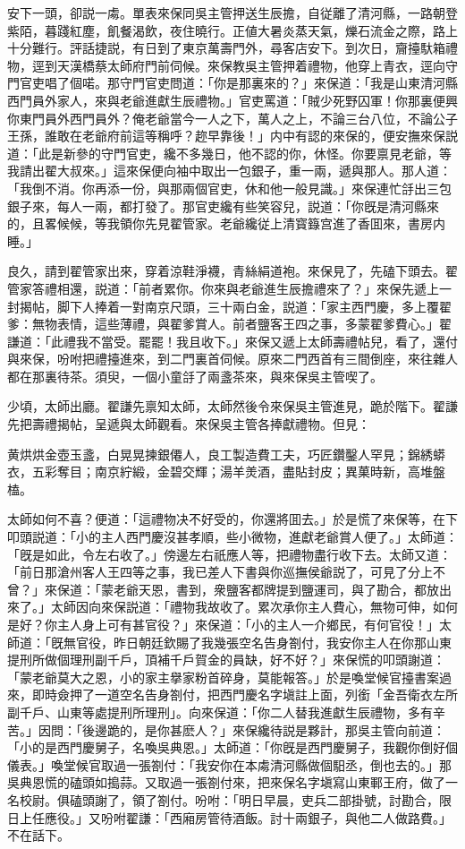安下一頭，卻説一䖏。單表來保同吳主管押送生辰擔，自従離了清河縣，一路朝登紫陌，暮踐紅塵，飢餐渴飲，夜住曉行。正値大暑炎蒸天氣，爍石流金之際，路上十分難行。評話捷説，有日到了東京萬壽門外，尋客店安下。到次日，齎擡馱箱禮物，逕到天漢橋蔡太師府門前伺候。來保教吳主管押着禮物，他穿上青衣，逕向守門官吏唱了個喏。那守門官吏問道：「你是那裏來的？」來保道：「我是山東清河縣西門員外家人，來與老爺進獻生辰禮物。」官吏罵道：「賊少死野囚軍！你那裏便興你東門員外西門員外？俺老爺當今一人之下，萬人之上，不論三台八位，不論公子王孫，誰敢在老爺府前這等稱呼？趂早靠後！」内中有認的來保的，便安撫來保説道：「此是新參的守門官吏，纔不多幾日，他不認的你，休怪。你要禀見老爺，等我請出翟大叔來。」這來保便向袖中取出一包銀子，重一兩，遞與那人。那人道：「我倒不消。你再添一份，與那兩個官吏，休和他一般見識。」來保連忙㧱出三包銀子來，每人一兩，都打發了。那官吏纔有些笑容兒，説道：「你旣是清河縣來的，且畧候候，等我領你先見翟管家。老爺纔従上清寳籙宫進了香囬來，書房内睡。」

良久，請到翟管家出來，穿着涼鞋淨襪，青絲絹道袍。來保見了，先磕下頭去。翟管家答禮相還，説道：「前者累你。你來與老爺進生辰擔禮來了？」來保先遞上一封揭帖，脚下人捧着一對南京尺頭，三十兩白金，説道：「家主西門慶，多上覆翟爹：無物表情，這些薄禮，與翟爹賞人。前者鹽客王四之事，多蒙翟爹費心。」翟謙道：「此禮我不當受。罷罷！我且收下。」來保又遞上太師壽禮帖兒，看了，還付與來保，吩咐把禮擡進來，到二門裏首伺候。原來二門西首有三間倒座，來往雜人都在那裏待茶。須臾，一個小童㧱了兩盞茶來，與來保吳主管喫了。

少頃，太師出廳。翟謙先禀知太師，太師然後令來保吳主管進見，跪於階下。翟謙先把壽禮揭帖，呈遞與太師觀看。來保吳主管各捧獻禮物。但見：

\begin{myquote}
黄烘烘金壺玉盞，白晃晃揀銀僊人，良工製造費工夫，巧匠鑽鑿人罕見；錦綉蟒衣，五彩奪目；南京紵緞，金碧交輝；湯羊羙酒，盡貼封皮；異菓時新，高堆盤榼。
\end{myquote}

太師如何不喜？便道：「這禮物决不好受的，你還將囬去。」於是慌了來保等，在下叩頭説道：「小的主人西門慶沒甚孝順，些小微物，進獻老爺賞人便了。」太師道：「旣是如此，令左右收了。」傍邊左右祇應人等，把禮物盡行收下去。太師又道：「前日那滄州客人王四等之事，我已差人下書與你巡撫侯爺説了，可見了分上不曾？」來保道：「蒙老爺天恩，書到，衆鹽客都牌提到鹽運司，與了勘合，都放出來了。」太師因向來保説道：「禮物我故收了。累次承你主人費心，無物可伸，如何是好？你主人身上可有甚官役？」來保道：「小的主人一介鄉民，有何官役！」太師道：「旣無官役，昨日朝廷欽賜了我幾張空名告身劄付，我安你主人在你那山東提刑所做個理刑副千戶，頂補千戶賀金的員缺，好不好？」來保慌的叩頭謝道：「蒙老爺莫大之恩，小的家主擧家粉首碎身，莫能報答。」於是喚堂候官擡書案過來，即時僉押了一道空名告身劄付，把西門慶名字塡註上面，列銜「金吾衛衣左所副千戶、山東等處提刑所理刑」。向來保道：「你二人替我進獻生辰禮物，多有辛苦。」因問：「後邊跪的，是你甚麽人？」來保纔待説是夥計，那吳主管向前道：「小的是西門慶舅子，名喚吳典恩。」太師道：「你旣是西門慶舅子，我觀你倒好個儀表。」喚堂候官取過一張劄付：「我安你在本䖏清河縣做個馹丞，倒也去的。」那吳典恩慌的磕頭如搗蒜。又取過一張劄付來，把來保名字塡寫山東鄆王府，做了一名校尉。俱磕頭謝了，領了劄付。吩咐：「明日早晨，吏兵二部掛號，討勘合，限日上任應役。」又吩咐翟謙：「西廂房管待酒飯。討十兩銀子，與他二人做路費。」不在話下。

